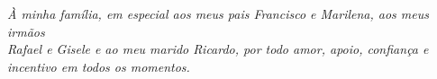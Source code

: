
\clearpage

\chapter*{}

\vfill

\vspace*{15cm}

\begin{flushright}
\textit{À minha família, em especial aos meus pais Francisco e Marilena, aos meus irmãos\\ Rafael e Gisele e ao meu marido Ricardo, por todo amor, apoio, confiança e incentivo em todos os momentos.}
\end{flushright}

\vspace*{1cm}

\clearpage


